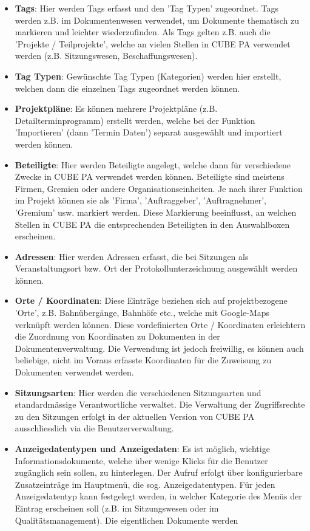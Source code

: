 \begin{itemize}
\item
\textbf{Tags}: Hier werden Tags erfasst und den 'Tag Typen' zugeordnet. Tags werden z.B. im Dokumentenwesen verwendet, um Dokumente thematisch zu markieren und leichter wiederzufinden. Als Tags gelten z.B. auch die 'Projekte / Teilprojekte', welche an vielen Stellen in CUBE PA verwendet werden (z.B. Sitzungswesen,
Beschaffungswesen).
\item
\textbf{Tag Typen}: Gewünschte Tag Typen (Kategorien) werden hier erstellt, welchen dann die einzelnen Tags zugeordnet
werden können.
\item
\textbf{Projektpläne}: Es können mehrere Projektpläne (z.B. Detailterminprogramm) erstellt werden, welche bei der Funktion 'Importieren' (dann 'Termin Daten') separat ausgewählt und importiert werden können.
\item
\textbf{Beteiligte}: Hier werden Beteiligte angelegt, welche dann für verschiedene Zwecke in CUBE PA verwendet werden können. Beteiligte sind meistens Firmen, Gremien oder andere Organisationseinheiten. Je nach ihrer Funktion im Projekt können sie als 'Firma', 'Auftraggeber', 'Auftragnehmer', 'Gremium' usw. markiert werden. Diese Markierung beeinflusst, an welchen Stellen in CUBE PA die entsprechenden Beteiligten in den Auswahlboxen erscheinen.
\item
\textbf{Adressen}: Hier werden Adressen erfasst, die bei Sitzungen als Veranstaltungsort bzw. Ort der Protokollunterzeichnung ausgewählt werden können.
\item
\textbf{Orte / Koordinaten}: Diese Einträge beziehen sich auf projektbezogene 'Orte', z.B. Bahnübergänge, Bahnhöfe etc., welche mit Google-Maps verknüpft werden können. Diese vordefinierten Orte / Koordinaten erleichtern die Zuordnung von Koordinaten zu Dokumenten in der Dokumentenverwaltung. Die Verwendung ist jedoch freiwillig, es können auch beliebige, nicht im Voraus erfasste Koordinaten für die Zuweisung zu Dokumenten verwendet werden.
\item
\textbf{Sitzungsarten}: Hier werden die verschiedenen Sitzungsarten und standardmässige Verantwortliche verwaltet. Die Verwaltung der Zugriffsrechte zu den Sitzungen erfolgt in der aktuellen Version von CUBE PA ausschliesslich via die Benutzerverwaltung.
\item
\textbf{Anzeigedatentypen und Anzeigedaten}: Es ist möglich, wichtige Informationsdokumente, welche über wenige Klicks für die Benutzer zugänglich sein sollen, zu hinterlegen. Der Aufruf erfolgt über konfigurierbare Zusatzeinträge im Hauptmenü, die sog. Anzeigedatentypen. Für jeden Anzeigedatentyp kann festgelegt werden, in welcher Kategorie des Menüs der Eintrag erscheinen soll (z.B. im Sitzungswesen oder im Qualitätsmanagement). Die eigentlichen Dokumente werden

\end{itemize}
